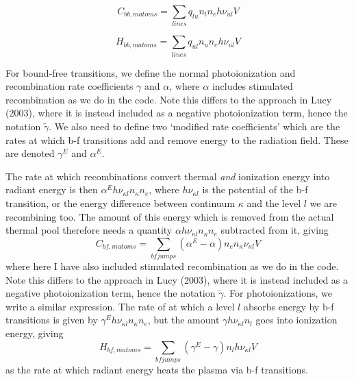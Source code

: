 \begin{equation}
C_{bb,matoms} = \sum_{lines} q_{lu} n_l n_e h \nu_{ul} V
\end{equation}

\begin{equation}
H_{bb,matoms} = \sum_{lines} q_{ul} n_u n_e h \nu_{ul} V
\end{equation}

\noindent
For bound-free transitions, we define the normal photoionization and recombination
rate coefficients $\gamma$ and $\alpha$, where $\alpha$ includes
stimulated recombination as we do in the code. Note
this differs to the approach in Lucy (2003), where it is instead included as a 
negative photoionization term, hence the notation $\widetilde{\gamma}$.
We also need to define two `modified rate coefficients' which 
are the rates at which b-f transitions add and remove energy to the radiation field.
These are denoted $\gamma^E$ and $\alpha^E$.

The rate at which recombinations convert
thermal {\em and} ionization energy into radiant energy is then
$\alpha^E h\nu_{\kappa l} n_\kappa n_e$, where $h \nu_{\kappa l}$ is the potential of the 
b-f transition, or the energy difference between continuum $\kappa$ and 
the level $l$ we are recombining too. 
The amount of this energy which is removed from the actual thermal pool
therefore needs a quantity $\alpha h\nu_{\kappa l} n_\kappa n_e$ subtracted from it,
giving
\begin{equation}
C_{bf,matoms} = \sum_{bf jumps} (\alpha^E - \alpha) n_e n_{\kappa}\nu_{\kappa l} V 
\end{equation}
where here I have also included stimulated recombination as we do in the code. Note
this differs to the approach in Lucy (2003), where it is instead included as a 
negative photoionization term, hence the notation $\widetilde{\gamma}$.
For photoionizations, we write a similar expression. The rate of at which
a level $l$ absorbs energy by b-f transitions is given by $\gamma^E h\nu_{\kappa l} n_\kappa n_e$,
but the amount $\gamma h \nu_{\kappa l} n_l$ goes into ionization energy, giving 
\begin{equation}
H_{bf,matoms} = \sum_{bf jumps} (\gamma^E - \gamma) n_l h \nu_{\kappa l} V
\end{equation}
as the rate at which radiant energy heats the plasma via b-f transitions.




